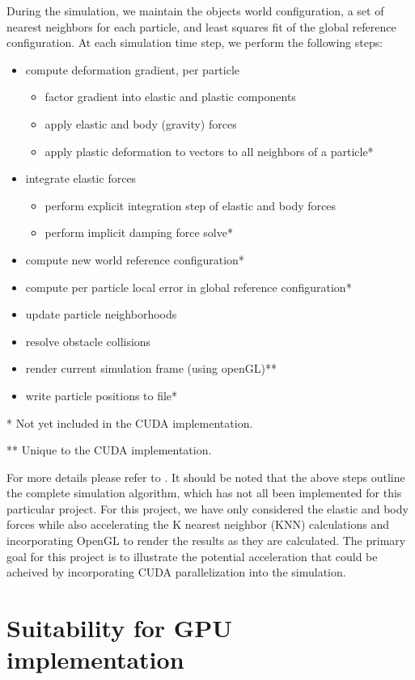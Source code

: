 \documentclass[cameraready]{acmsiggraph-awb}
\begin{document}
During the simulation, we maintain the objects world configuration, a set of nearest neighbors for each particle, and least squares fit of the global reference configuration.  At each simulation time step, we perform the following steps:
\begin{itemize}

\item compute deformation gradient, per particle
\begin{itemize}
\item factor gradient into elastic and plastic components
\item apply elastic and body (gravity) forces
\item apply plastic deformation to vectors to all neighbors of a particle*
\end{itemize}
\item integrate elastic forces
\begin{itemize}
\item perform explicit integration step of elastic and body forces
\item perform implicit damping force solve* 
\end{itemize}
\item compute new world reference configuration* 
\item compute per particle local error in global reference configuration* 
\item update particle neighborhoods 
\item resolve obstacle collisions
\item render current simulation frame (using openGL)**
\item write particle positions to file*
\end{itemize}

* Not yet included in the CUDA implementation.

** Unique to the CUDA implementation.

For more details please refer to \cite{us}.
It should be noted that the above steps outline the complete simulation algorithm, which has not all been implemented for this particular project.
For this project, we have only considered the elastic and body forces while also accelerating the K nearest neighbor (KNN) calculations and incorporating OpenGL to render the results as they are calculated.
The primary goal for this project is to illustrate the potential acceleration that could be acheived by incorporating CUDA parallelization into the simulation.


\section{Suitability for GPU implementation}
\end{document}
